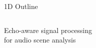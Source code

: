 \begin{frame}[standout]{1D Outline}
    \begin{columns}
        \begin{column}{0.35\textwidth}
            Echo-aware signal processing
            \\for audio scene analysis
        \end{column}
        \begin{column}{0.05\textwidth}
        \end{column}
        \begin{column}{0.6\textwidth}
            {
                \tableofcontents
            }
        \end{column}
    \end{columns}
\end{frame}